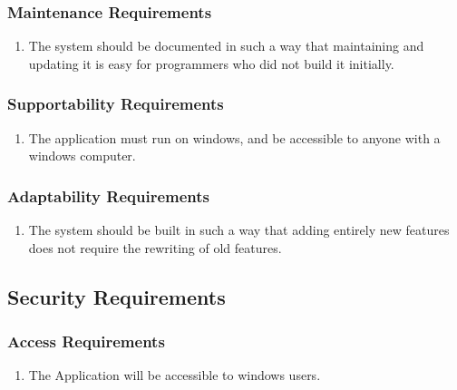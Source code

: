 \documentclass[english]{article}
\begin{document}
\subsubsection{Maintenance Requirements}
\label{ssub:maintenance_requirements}
\begin{enumerate}[{MR}1. ]
\item The system should be documented in such a way that maintaining and updating it is easy for programmers who did not build it initially. 

\end{enumerate}

\subsubsection{Supportability Requirements}
\label{ssub:supportability_requirements}
\begin{enumerate}[{MSR}1. ]
\item The application must run on windows, and be accessible to anyone with a windows computer. 

\end{enumerate}

\subsubsection{Adaptability Requirements}
\label{ssub:adaptability_requirements}
\begin{enumerate}[{MAR}1. ]
\item The system should be built in such a way that adding entirely new features does not require the rewriting of old features. 

\end{enumerate}


\subsection{Security Requirements}
\label{sub:security_requirements}

\subsubsection{Access Requirements}
\label{ssub:access_requirements}
\begin{enumerate}[{SAR}1. ]
\item The Application will be accessible to windows users. 


\end{enumerate}
\end{document}

